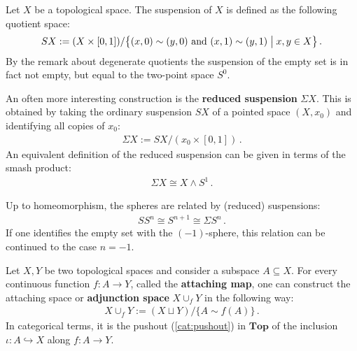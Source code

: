     \begin{construct}[Suspension]\label{topology:suspension}
        Let $X$ be a topological space. The suspension of $X$ is defined as the following quotient space:
        \begin{gather}
            SX := (X\times [0,1])/\bigl\{(x,0)\sim (y,0)\text{ and }(x,1)\sim (y,1)\bigm\vert x,y\in X\bigr\}\,.
        \end{gather}
        By the remark about degenerate quotients the suspension of the empty set is in fact not empty, but equal to the two-point space $S^0$.

        An often more interesting construction is the \textbf{reduced suspension} $\Sigma X$. This is obtained by taking the ordinary suspension $SX$ of a pointed space $(X,x_0)$ and identifying all copies of $x_0$:
        \begin{gather}
            \Sigma X := SX/(x_0\times[0,1])\,.
        \end{gather}
        An equivalent definition of the reduced suspension can be given in terms of the smash product:
        \begin{gather}
            \Sigma X\cong X\wedge S^1\,.
        \end{gather}
    \end{construct}
    \begin{example}[Spheres]\label{topology:sphere_suspension}
        Up to homeomorphism, the spheres are related by (reduced) suspensions:
        \begin{gather}
            SS^n\cong S^{n+1}\cong\Sigma S^n\,.
        \end{gather}
        If one identifies the empty set with the $(-1)$-sphere, this relation can be continued to the case $n=-1$.
    \end{example}

    \begin{construct}\label{topology:attaching_space}
        Let $X,Y$ be two topological spaces and consider a subspace $A\subseteq X$. For every continuous function $f:A\rightarrow Y$, called the \textbf{attaching map}, one can construct the attaching space or \textbf{adjunction space} $X\cup_f Y$ in the following way:
        \begin{gather}
            X\cup_f Y := (X\sqcup Y)/\{A\sim f(A)\}\,.
        \end{gather}
        In categorical terms, it is the pushout (\cref{cat:pushout}) in $\mathbf{Top}$ of the inclusion $\iota:A\hookrightarrow X$ along $f:A\rightarrow Y$.
    \end{construct}


